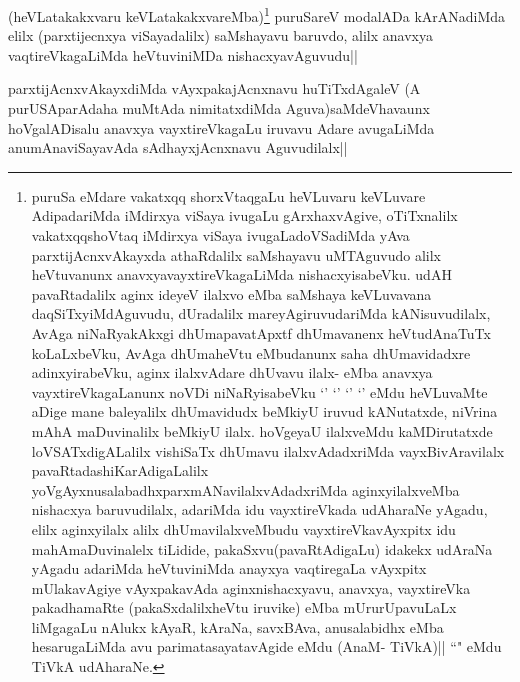 \begin{artha}
(heVLatakakxvaru keVLatakakxvareMba)\footnote{puruSa eMdare vakatxqq shorxVtaqgaLu heVLuvaru keVLuvare AdipadariMda iMdirxya viSaya ivugaLu gArxhaxvAgive, oTiTxnalilx vakatxqqshoVtaq iMdirxya viSaya ivugaLadoVSadiMda yAva parxtijAcnxvAkayxda athaRdalilx saMshayavu uMTAguvudo alilx heVtuvanunx anavxyavayxtireVkagaLiMda nishacxyisabeVku. udAH pavaRtadalilx aginx ideyeV ilalxvo eMba saMshaya keVLuvavana daqSiTxyiMdAguvudu, dUradalilx mareyAgiruvudariMda kANisuvudilalx, AvAga niNaRyakAkxgi dhUmapavatApxtf dhUmavanenx heVtudAnaTuTx koLaLxbeVku, AvAga dhUmaheVtu eMbudanunx saha dhUmavidadxre adinxyirabeVku, aginx ilalxvAdare dhUvavu ilalx- eMba anavxya vayxtireVkagaLanunx noVDi niNaRyisabeVku `\stext' `\stext' `\stext' `\stext' eMdu heVLuvaMte aDige mane baleyalilx dhUmavidudx beMkiyU iruvud kANutatxde, niVrina mAhA maDuvinalilx beMkiyU ilalx. hoVgeyaU ilalxveMdu kaMDirutatxde loVSATxdigALalilx vishiSaTx dhUmavu ilalxvAdadxriMda vayxBivAravilalx pavaRtadashiKarAdigaLalilx yoVgAyxnusalabadhxparxmANavilalxvAdadxriMda aginxyilalxveMba nishacxya baruvudilalx, adariMda idu vayxtireVkada udAharaNe yAgadu, elilx aginxyilalx alilx dhUmavilalxveMbudu vayxtireVkavAyxpitx idu mahAmaDuvinalelx tiLidide, pakaSxvu(pavaRtAdigaLu) idakekx udAraNa yAgadu adariMda heVtuviniMda anayxya vaqtiregaLa vAyxpitx mUlakavAgiye vAyxpakavAda aginxnishacxyavu, anavxya, vayxtireVka pakadhamaRte (pakaSxdalilxheVtu iruvike) eMba mUrurUpavuLaLx liMgagaLu nAlukx kAyaR, kAraNa, savxBAva, anusalabidhx eMba hesarugaLiMda avu parimatasayatavAgide eMdu (AnaM- TiVkA)|| ``\stext" eMdu TiVkA udAharaNe.} puruSareV modalADa kArANadiMda elilx (parxtijecnxya viSayadalilx) saMshayavu baruvdo, alilx anavxya vaqtireVkagaLiMda heVtuviniMDa nishacxyavAguvudu||
\end{artha}

\begin{artha}
parxtijAcnxvAkayxdiMda vAyxpakajAcnxnavu huTiTxdAgaleV (A purUSAparAdaha muMtAda nimitatxdiMda Aguva)saMdeVhavaunx hoVgalADisalu anavxya vayxtireVkagaLu iruvavu Adare avugaLiMda anumAnaviSayavAda sAdhayxjAcnxnavu Aguvudilalx||
\end{artha}


